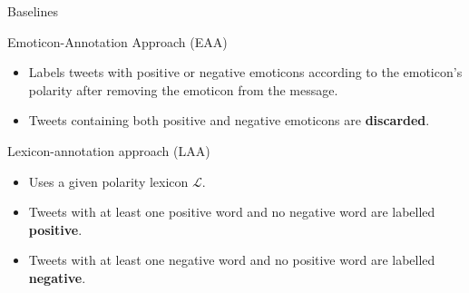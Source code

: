 \documentclass[handout]{beamer}
\begin{document}
\begin{frame}{Baselines}
\begin{scriptsize}
\begin{block}{Emoticon-Annotation Approach (EAA)}
\begin{itemize}
\item Labels tweets with positive or negative emoticons according to the emoticon's polarity after removing the emoticon from the message.
\item  Tweets containing both positive and negative emoticons are \textbf{discarded}.
\end{itemize}
\end{block}

\begin{block}{Lexicon-annotation approach (LAA)}
\begin{itemize}
\item Uses a given polarity lexicon $\mathcal{L}$.
\item Tweets with at least one positive word and no negative word are labelled \textbf{positive}.
\item Tweets with at least one negative word and no positive word are labelled \textbf{negative}.
\end{itemize}
\end{block}

\end{scriptsize}
\end{frame}
\end{document}
